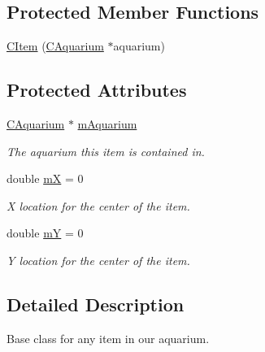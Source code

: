 \subsection*{Protected Member Functions}
\begin{DoxyCompactItemize}
\item 
\mbox{\hyperlink{class_c_item_a665b3fa4628b43e69b1d7f2b9529882b}{C\+Item}} (\mbox{\hyperlink{class_c_aquarium}{C\+Aquarium}} $\ast$aquarium)
\end{DoxyCompactItemize}
\subsection*{Protected Attributes}
\begin{DoxyCompactItemize}
\item 
\mbox{\label{class_c_item_a5e94975f17e23f60c3b2621cc51184fd}} 
\mbox{\hyperlink{class_c_aquarium}{C\+Aquarium}} $\ast$ \mbox{\hyperlink{class_c_item_a5e94975f17e23f60c3b2621cc51184fd}{m\+Aquarium}}
\begin{DoxyCompactList}\small\item\em The aquarium this item is contained in. \end{DoxyCompactList}\item 
\mbox{\label{class_c_item_a117d84a11511b2de62db8503fcdcd10d}} 
double \mbox{\hyperlink{class_c_item_a117d84a11511b2de62db8503fcdcd10d}{mX}} = 0
\begin{DoxyCompactList}\small\item\em X location for the center of the item. \end{DoxyCompactList}\item 
\mbox{\label{class_c_item_aea603602d9fa9db7a6f9ab40b9dcfd4a}} 
double \mbox{\hyperlink{class_c_item_aea603602d9fa9db7a6f9ab40b9dcfd4a}{mY}} = 0
\begin{DoxyCompactList}\small\item\em Y location for the center of the item. \end{DoxyCompactList}\end{DoxyCompactItemize}


\subsection{Detailed Description}
Base class for any item in our aquarium. 

